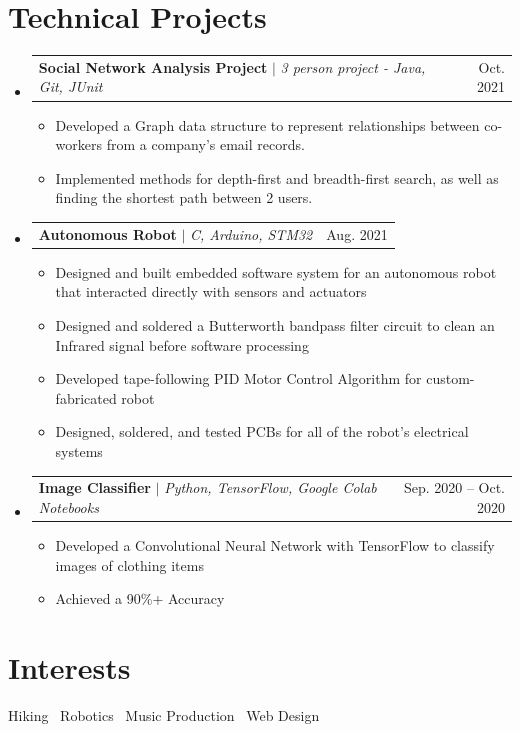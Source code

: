 \documentclass[letterpaper,11pt]{article}
\makeatletter
\newcommand{\resumeItem}[1]{
  \item\small{
    {#1 \vspace{-2pt}}
  }
}
\newcommand{\resumeProjectHeading}[2]{
    \item
    \begin{tabular*}{0.97\textwidth}{l@{\extracolsep{\fill}}r}
      \small#1 & #2 \\
    \end{tabular*}\vspace{-7pt}
}
\newcommand{\resumeSubHeadingListStart}{\begin{itemize}[leftmargin=0.15in, label={}]}
\newcommand{\resumeSubHeadingListEnd}{\end{itemize}}
\newcommand{\resumeItemListStart}{\begin{itemize}}
\newcommand{\resumeItemListEnd}{\end{itemize}\vspace{-5pt}}
\makeatother
\begin{document}
\section{Technical Projects}
    \resumeSubHeadingListStart
      \resumeProjectHeading
          {\textbf{Social Network Analysis Project}
          $|$ \emph{3 person project - Java, Git, JUnit}
          }{Oct. 2021}
          \resumeItemListStart
            \resumeItem{Developed a Graph data structure to represent relationships between co-workers from a company's email records.}
            \resumeItem{Implemented methods for depth-first and breadth-first search, as well as finding the shortest path between 2 users.}
          \resumeItemListEnd
          
        \resumeProjectHeading
          {\textbf{Autonomous Robot}
          $|$ \emph{C, Arduino, STM32}
          }{Aug. 2021}
          \resumeItemListStart
            \resumeItem{Designed and built embedded software system for an autonomous robot that interacted directly with sensors and actuators}
            \resumeItem{Designed and soldered a Butterworth bandpass filter circuit to clean an Infrared signal before software processing}
            \resumeItem{Developed tape-following PID Motor Control Algorithm for custom-fabricated robot}
            \resumeItem{Designed, soldered, and tested PCBs for all of the robot's electrical systems}
          \resumeItemListEnd
          
      \resumeProjectHeading
          {\textbf{Image Classifier} 
          $|$ \emph{Python, TensorFlow, Google Colab Notebooks} 
          }{Sep. 2020 -- Oct. 2020}
          \resumeItemListStart
            \resumeItem{Developed a Convolutional Neural Network with TensorFlow to classify images of clothing items}
            \resumeItem{Achieved a 90\%+ Accuracy}
          \resumeItemListEnd
          
         
    \resumeSubHeadingListEnd

\section{Interests}

    \small{Hiking \textbullet \ Robotics \textbullet \  Music Production \textbullet \ Web Design }

\end{document}

